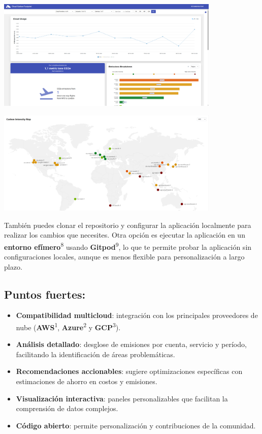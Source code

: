 \documentclass[12pt,a4paper]{report}
\begin{document}
\begin{center}
  \includegraphics[width=0.8\textwidth]{imagenes/CCF_1.png}
\end{center}

\begin{center}
  \includegraphics[width=0.8\textwidth]{imagenes/CCF_2.png}
\end{center}

También puedes clonar el repositorio y configurar la aplicación localmente para realizar los cambios que necesites. Otra opción es ejecutar la aplicación en un \textbf{entorno efímero}\textsuperscript{8} usando \textbf{Gitpod}\textsuperscript{9}, lo que te permite probar la aplicación sin configuraciones locales, aunque es menos flexible para personalización a largo plazo.

\subsection*{Puntos fuertes:}

\begin{itemize}
  \item \textbf{Compatibilidad multicloud}: integración con los principales proveedores de nube (\textbf{AWS}\textsuperscript{1}, \textbf{Azure}\textsuperscript{2} y \textbf{GCP}\textsuperscript{3}).
  \item \textbf{Análisis detallado}: desglose de emisiones por cuenta, servicio y período, facilitando la identificación de áreas problemáticas.
  \item \textbf{Recomendaciones accionables}: sugiere optimizaciones específicas con estimaciones de ahorro en costos y emisiones.
  \item \textbf{Visualización interactiva}: paneles personalizables que facilitan la comprensión de datos complejos.
  \item \textbf{Código abierto}: permite personalización y contribuciones de la comunidad.
\end{itemize}
\end{document}
